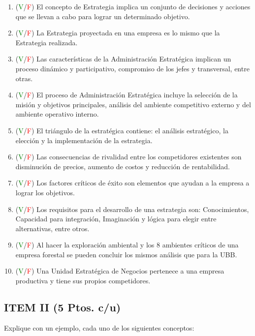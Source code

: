 \documentclass{templateNote}
\begin{document}
\begin{enumerate}
    \item (\textcolor{green}{V}/\textcolor{red}{F}) El concepto de Estrategia implica un conjunto de decisiones y acciones que se llevan a cabo para lograr un determinado objetivo.
    \item (\textcolor{green}{V}/\textcolor{red}{F}) La Estrategia proyectada en una empresa es lo mismo que la Estrategia realizada.
    \item (\textcolor{green}{V}/\textcolor{red}{F}) Las características de la Administración Estratégica implican un proceso dinámico y participativo, compromiso de los jefes y transversal, entre otras.
    \item (\textcolor{green}{V}/\textcolor{red}{F}) El proceso de Administración Estratégica incluye la selección de la misión y objetivos principales, análisis del ambiente competitivo externo y del ambiente operativo interno.
    \item (\textcolor{green}{V}/\textcolor{red}{F}) El triángulo de la estratégica contiene: el análisis estratégico, la elección y la implementación de la estrategia.
    \item (\textcolor{green}{V}/\textcolor{red}{F}) Las consecuencias de rivalidad entre los competidores existentes son disminución de precios, aumento de costos y reducción de rentabilidad.
    \item (\textcolor{green}{V}/\textcolor{red}{F}) Los factores críticos de éxito son elementos que ayudan a la empresa a lograr los objetivos. 
    \item (\textcolor{green}{V}/\textcolor{red}{F}) Los requisitos para el desarrollo de una estrategia son: Conocimientos, Capacidad para integración, Imaginación y lógica para elegir entre alternativas, entre otros.
    \item (\textcolor{green}{V}/\textcolor{red}{F}) Al hacer la exploración ambiental y los 8 ambientes críticos de una empresa forestal se pueden concluir los mismos análisis que para la UBB. 
    \item (\textcolor{green}{V}/\textcolor{red}{F}) Una Unidad Estratégica de Negocios pertenece a una empresa productiva y tiene sus propios competidores.
\end{enumerate}

\newpage
\subsection*{ITEM II (5 Ptos. c/u)}
Explique con un ejemplo, cada uno de los siguientes conceptos: 
\end{document}
